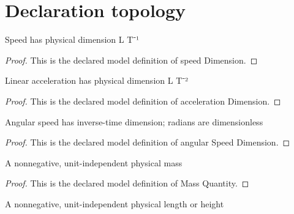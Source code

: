 \section{Declaration topology}
\begin{definition}
  \label{def:physics:phyx-mini-0788:phyxminiproblems-problemphyxmini0788-speeddimension}
  Speed has physical dimension L T⁻¹
\end{definition}
\begin{proof}
  This is the declared model definition of speed Dimension.
\end{proof}
\begin{definition}
  \label{def:physics:phyx-mini-0788:phyxminiproblems-problemphyxmini0788-accelerationdimension}
  Linear acceleration has physical dimension L T⁻²
\end{definition}
\begin{proof}
  This is the declared model definition of acceleration Dimension.
\end{proof}
\begin{definition}
  \label{def:physics:phyx-mini-0788:phyxminiproblems-problemphyxmini0788-angularspeeddimension}
  Angular speed has inverse-time dimension; radians are dimensionless
\end{definition}
\begin{proof}
  This is the declared model definition of angular Speed Dimension.
\end{proof}
\begin{definition}
  \label{def:physics:phyx-mini-0788:phyxminiproblems-problemphyxmini0788-massquantity}
  A nonnegative, unit-independent physical mass
\end{definition}
\begin{proof}
  This is the declared model definition of Mass Quantity.
\end{proof}
\begin{definition}
  \label{def:physics:phyx-mini-0788:phyxminiproblems-problemphyxmini0788-lengthquantity}
  A nonnegative, unit-independent physical length or height
\end{definition}
